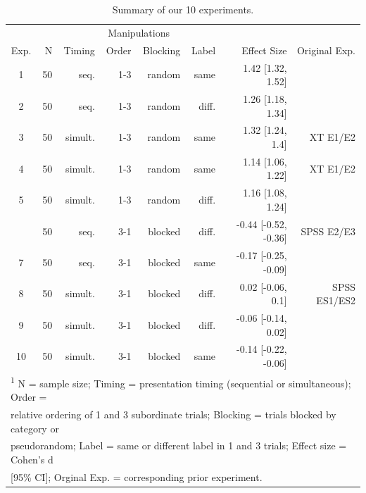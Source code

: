 \documentclass[english,floatsintext,man]{apa6}
\theoremstyle{definition}
\theoremstyle{definition}
\theoremstyle{remark}
\begin{document}
\begin{table}

\caption{\label{tab:unnamed-chunk-3}Summary of our 10 experiments.}
\centering
\fontsize{12}{14}\selectfont
\begin{tabular}[t]{crrrrrrr}
\toprule
\multicolumn{2}{c}{ } & \multicolumn{4}{c}{Manipulations} & \multicolumn{1}{c}{ } \\
\cmidrule(l{2pt}r{2pt}){3-6}
Exp. & N & Timing & Order & Blocking & Label & Effect Size & Original 
Exp.\\
\midrule
1 & 50 & seq. & 1-3 & random & same & 1.42 [1.32, 1.52] & \\
2 & 50 & seq. & 1-3 & random & diff. & 1.26 [1.18, 1.34] & \\
3 & 50 & simult. & 1-3 & random & same & 1.32 [1.24, 1.4] & XT E1/E2\\
4 & 50 & simult. & 1-3 & random & same & 1.14 [1.06, 1.22] & XT E1/E2\\
5 & 50 & simult. & 1-3 & random & diff. & 1.16 [1.08, 1.24] & \\
\addlinespace
6 & 50 & seq. & 3-1 & blocked & diff. & -0.44 [-0.52, -0.36] & SPSS E2/E3\\
7 & 50 & seq. & 3-1 & blocked & same & -0.17 [-0.25, -0.09] & \\
8 & 50 & simult. & 3-1 & blocked & diff. & 0.02 [-0.06, 0.1] & SPSS ES1/ES2\\
9 & 50 & simult. & 3-1 & blocked & diff. & -0.06 [-0.14, 0.02] & \\
10 & 50 & simult. & 3-1 & blocked & same & -0.14 [-0.22, -0.06] & \\
\bottomrule
\multicolumn{8}{l}{\textsuperscript{1} N = sample size; Timing = presentation timing (sequential or simultaneous); Order =}\\
\multicolumn{8}{l}{relative ordering of 1 and 3 subordinate trials; Blocking = trials blocked by category or}\\
\multicolumn{8}{l}{pseudorandom; Label = same or different label in 1 and 3 trials; Effect size = Cohen's d}\\
\multicolumn{8}{l}{[95\% CI]; Orginal Exp. = corresponding prior experiment.}\\
\end{tabular}
\end{table}
\end{document}
